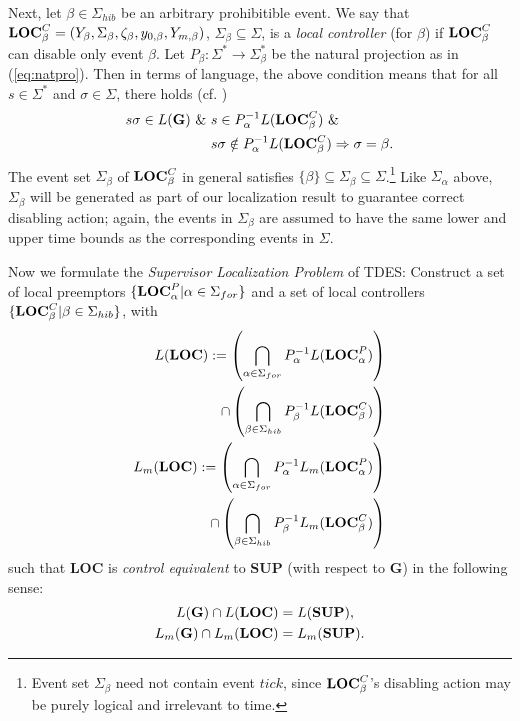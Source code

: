\documentclass[twocolumn]{autart}
\begin{document}
Next, let $\beta \in \Sigma_{hib}$ be an arbitrary prohibitible
event. We say that ${\bf LOC}^C_{\beta} = (Y_\beta, \Sigma_\beta,
\zeta_\beta, y_{0,\beta}, Y_{m,\beta})$, $\Sigma_\beta \subseteq
\Sigma$, is a {\it local controller} (for $\beta$) if ${\bf
LOC}^C_{\beta}$ can disable only event $\beta$. Let
$P_{\beta} : \Sigma^* \rightarrow \Sigma_{\beta}^*$ be the natural
projection as in (\ref{eq:natpro}). Then in terms of language, the
above condition means that for all $s \in \Sigma^*$ and $\sigma \in
\Sigma$, there holds (cf. \cite{CaiWonham:2010a})
\begin{align*}
s\sigma \in L({\bf G}) ~\&~ &s\in P^{-1}_{\alpha} L({\bf
LOC}^C_{\beta}) ~\&~ \\
 &s\sigma \notin P^{-1}_{\alpha} L({\bf
LOC}^C_{\beta})  \Rightarrow  \sigma = \beta.
\end{align*}
The event set $\Sigma_\beta$ of ${\bf LOC}^C_{\beta}$ in general
satisfies $\{\beta\}\subseteq \Sigma_\beta \subseteq
\Sigma$.\footnote{Event set $\Sigma_\beta$ need not contain event
$tick$, since ${\bf LOC}^C_{\beta}$'s disabling action may be purely
logical and irrelevant to time.\label{fnote:beta}} Like
$\Sigma_\alpha$ above, $\Sigma_\beta$ will be generated as part of
our localization result to guarantee correct disabling action;
again, the events in $\Sigma_\beta$ are assumed to have the same
lower and upper time bounds as the corresponding events in $\Sigma$.

Now we formulate the {\it Supervisor Localization Problem} of TDES:
Construct a set of local preemptors  $\{{\bf LOC}^P_{\alpha}|\alpha
\in \Sigma_{for}\}$ and a set of local controllers $\{{\bf
LOC}^C_{\beta}|\beta \in \Sigma_{hib}\}$, with
\begin{align}
   L({\bf LOC}) := \left(\mathop \bigcap\limits_{\alpha \in \Sigma_{for}}P_\alpha^{-1}L({\bf LOC}^P_{\alpha}) \right) \notag\\
   \cap \left(\mathop \bigcap\limits_{\beta \in \Sigma_{hib}}P_\beta^{-1}L({\bf LOC}^C_{\beta}) \right) \label{e20}\\
   L_m({\bf LOC}) := \left(\mathop \bigcap\limits_{\alpha \in \Sigma_{for}}P_\alpha^{-1}L_m({\bf LOC}^P_{\alpha})\right)\notag \\
   \cap \left(\mathop \bigcap\limits_{\beta \in \Sigma_{hib}}P_\beta^{-1}L_m({\bf LOC}^C_{\beta}) \right) \label{e21}
\end{align}
such that {\bf LOC} is \emph{control equivalent} to {\bf SUP} (with
respect to {\bf G}) in the following sense:
\begin{align*}
   L({\bf G}) \cap L({\bf LOC}) &= L({\bf SUP}), \\
   L_m({\bf G}) \cap L_m({\bf LOC}) &= L_m({\bf SUP}).
\end{align*}
\end{document}
